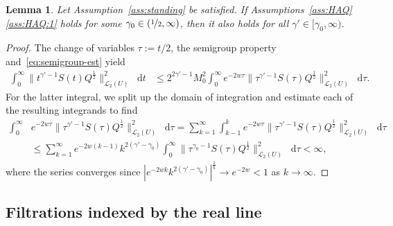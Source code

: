 \documentclass[reqno]{amsart}
\numberwithin{equation}{section}
\newcommand{\rd}{\mathop{}\!\mathrm{d}}
\newtheorem{lemma}{Lemma}[section]
\theoremstyle{remark}
\theoremstyle{definition}
\begin{document}
\begin{lemma}\label{lem:intb-assumption-nestedness}
	Let Assumption~\textup{\ref{ass:standing}} be satisfied.
	If Assumptions~\textup{\ref{ass:HAQ}\ref{ass:HAQ:1}}
	holds for some $\gamma_0 \in (\nicefrac{1}{2}, \infty)$, then 
	it also holds for all $\gamma' \in [\gamma_0, \infty)$.
\end{lemma}
%
\begin{proof}
	The change of variables $\tau := t/2$, the semigroup property and~\eqref{eq:semigroup-est} yield
	\begin{align*}
		\int_0^\infty \| t^{\gamma' - 1} S(t)Q^\frac{1}{2} \|_{\mathscr L_2(U)}^2 \rd t
		&\le 
		2^{2\gamma' - 1} M_0^2 \int_0^\infty e^{-2w\tau} \| \tau^{\gamma' - 1} S(\tau)Q^\frac{1}{2} \|_{\mathscr L_2(U)}^2 \rd \tau.
	\end{align*}
	For the latter integral, we split up the domain of integration and estimate
	each of the resulting integrands to find
	\begin{align*}
		\int_0^\infty &e^{-2w\tau} \| \tau^{\gamma' - 1} S(\tau)Q^\frac{1}{2} \|_{\mathscr L_2(U)}^2 \rd \tau
		=
		\sum_{k=1}^{\infty} \int_{k-1}^k e^{-2w\tau} \| \tau^{\gamma' - 1} S(\tau)Q^\frac{1}{2} \|_{\mathscr L_2(U)}^2 \rd \tau
		\\
		&\le 
		\sum_{k=1}^{\infty} e^{-2w(k-1)} k^{2(\gamma' - \gamma_0)} \int_0^\infty  \| \tau^{\gamma_0-1} S(\tau)Q^\frac{1}{2} \|_{\mathscr L_2(U)}^2 \rd \tau 
		< \infty,
	\end{align*}
	where the series converges since $|e^{-2wk} k^{2(\gamma' - \gamma_0)}|^{\frac{1}{k}} \to e^{-2w} < 1$
	as $k \to \infty$.
\end{proof}

\subsection{Filtrations indexed by the real line}
\end{document}
